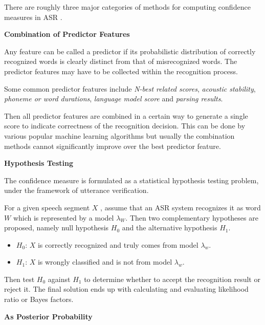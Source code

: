 \documentclass[11pt,a4paper,titlepage]{article}
\begin{document}
There are roughly three major categories of methods for computing confidence measures in ASR \cite{jiang2005confidence}.

\bigskip

\noindent \textbf{Combination of Predictor Features}

\medskip

Any feature can be called a predictor if its probabilistic distribution of correctly recognized words is clearly distinct from that of misrecognized words.
The predictor features may have to be collected within the recognition process.

Some common predictor features include \textit{N-best related scores}, \textit{acoustic stability}, \textit{phoneme or word durations}, \textit{language model score} and \textit{parsing results}.

Then all predictor features are combined in a certain way to generate a single score to indicate correctness of the recognition decision.
This can be done by various popular machine learning algorithms but usually the combination methods cannot significantly improve over the best predictor feature.

\bigskip

\noindent \textbf{Hypothesis Testing}

\medskip

The confidence measure is formulated as a statistical hypothesis testing problem, under the framework of utterance verification.

For a given speech segment \(X\) , assume that an ASR system recognizes it as word \(W\) which is represented by a model \(\lambda_W\).
Then two complementary hypotheses are proposed, namely null hypothesis \(H_0\) and the alternative hypothesis \(H_1\).

\begin{itemize}
  \item \(H_0\): \(X\) is correctly recognized and truly comes from model \(\lambda_w\).
  \item \(H_1\): \(X\) is wrongly classified and is not from model \(\lambda_w\).
\end{itemize}

Then test \(H_0\) against \(H_1\) to determine whether to accept the recognition result or reject it.
The final solution ends up with calculating and evaluating likelihood ratio or Bayes factors.

\bigskip

\noindent \textbf{As Posterior Probability}
\end{document}
